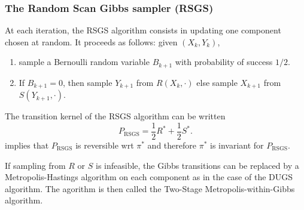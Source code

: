 \documentclass[english,graybox,envcountchap,envcountsame,sectrefs,shortlabels]{svmono}
\theoremstyle{style}
\newcommand{\eqsp}{}
\begin{document}
\subsubsection*{The Random Scan Gibbs sampler (RSGS)}
 
At each iteration, the RSGS algorithm consists in updating one component chosen at random. It
proceeds as follows: given $(X_k,Y_k)$,
\begin{enumerate}[label=(RSGS\arabic*)]
\item \label{item:rsgs-gibbs-0} sample a Bernoulli random variable $B_{k+1}$ with probability of
  success $1/2$.
\item \label{item:rsgs-gibbs-1} If $B_{k+1}= 0$, then sample $Y_{k+1}$ from $R(X_k,\cdot)$ else
  sample $X_{k+1}$ from $S(Y_{k+1},\cdot)$.
\end{enumerate}
The transition kernel of the RSGS algorithm can be written
\begin{equation}
  \label{eq:kernel:RSGS}
  P_{\mathrm{RSGS}}= \frac{1}{2} R^* + \frac{1}{2} S^* \eqsp.
\end{equation}
 implies that $P_{\mathrm{RSGS}}$ is reversible wrt
$\pi^*$ and therefore  $\pi^*$ is invariant for $P_{\mathrm{RSGS}}$.

If sampling from $R$ or $S$ is infeasible, the Gibbs transitions can be replaced by a
Metropolis-Hastings algorithm on each component as in the case of the DUGS algorithm. The agorithm
is then called the Two-Stage Metropolis-within-Gibbs algorithm.
\end{document}
